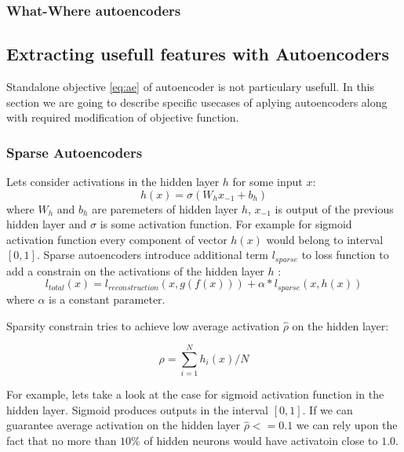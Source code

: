 \subsubsection{What-Where autoencoders}



\subsection{Extracting usefull features with Autoencoders}\label{ch:sae}

Standalone objective \ref{eq:ae} of autoencoder is not particulary usefull.
In this section we are going to describe specific usecases of aplying autoencoders along with required modification of objective function.

\subsubsection{Sparse Autoencoders}\label{ch:vae}

Lets consider activations in the hidden layer $h$ for some input $x$:
\begin{equation}
  h(x) = \sigma(W_{h}x_{-1} + b_{h})
\end{equation}
where $W_h$ and $b_h$ are paremeters of hidden layer $h$, $x_{-1}$ is output of the previous hidden layer and $\sigma$ is some activation function.
For example for sigmoid activation function every component of vector $h(x)$ would belong to interval $[0, 1]$.
Sparse autoencoders introduce additional term $l_{sparse}$ to loss function to add a constrain on the activations of the hidden layer $h$ \cite{Ng2011}:
\begin{equation}
  l_{total}(x) = l_{reconstruction}(x, g(f(x))) + \alpha*l_{sparse}(x, h(x))
\end{equation}
where $\alpha$ is a constant parameter.

Sparsity constrain tries to achieve low average activation $\hat{\rho}$ on the hidden layer:

\begin{equation}\label{eq:avgh}
  \rho = \sum_{i=1}^N h_i(x)/N
\end{equation}

For example, lets take a look at the case for sigmoid activation function in the hidden layer.
Sigmoid produces outputs in the interval $[0, 1]$. If we can guarantee average activation on the hidden layer $\hat{\rho} <= 0.1$ we can rely upon the fact that no more than $10\%$ of hidden neurons would have activatoin close to $1.0$.

